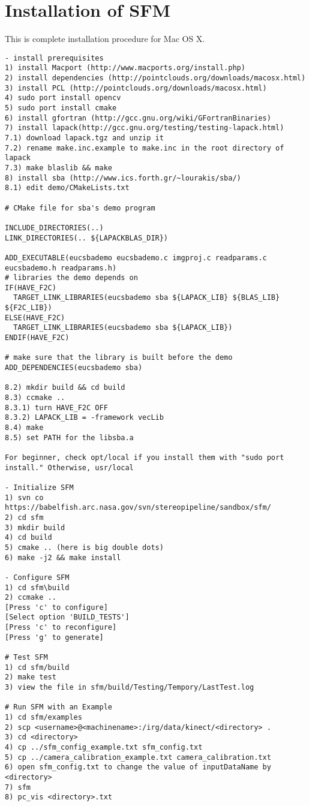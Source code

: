 \documentclass[12pt]{article}
\begin{document}
\section{Installation of SFM}

This is complete installation procedure for Mac OS X.

\begin{lstlisting}
- install prerequisites
1) install Macport (http://www.macports.org/install.php) 
2) install dependencies (http://pointclouds.org/downloads/macosx.html)
3) install PCL (http://pointclouds.org/downloads/macosx.html)
4) sudo port install opencv
5) sudo port install cmake
6) install gfortran (http://gcc.gnu.org/wiki/GFortranBinaries)
7) install lapack(http://gcc.gnu.org/testing/testing-lapack.html)
7.1) download lapack.tgz and unzip it
7.2) rename make.inc.example to make.inc in the root directory of lapack 
7.3) make blaslib && make
8) install sba (http://www.ics.forth.gr/~lourakis/sba/) 
8.1) edit demo/CMakeLists.txt

# CMake file for sba's demo program

INCLUDE_DIRECTORIES(..)
LINK_DIRECTORIES(.. ${LAPACKBLAS_DIR})

ADD_EXECUTABLE(eucsbademo eucsbademo.c imgproj.c readparams.c eucsbademo.h readparams.h)
# libraries the demo depends on
IF(HAVE_F2C)
  TARGET_LINK_LIBRARIES(eucsbademo sba ${LAPACK_LIB} ${BLAS_LIB} ${F2C_LIB})
ELSE(HAVE_F2C)
  TARGET_LINK_LIBRARIES(eucsbademo sba ${LAPACK_LIB})
ENDIF(HAVE_F2C)

# make sure that the library is built before the demo
ADD_DEPENDENCIES(eucsbademo sba)

8.2) mkdir build && cd build
8.3) ccmake ..
8.3.1) turn HAVE_F2C OFF
8.3.2) LAPACK_LIB = -framework vecLib
8.4) make
8.5) set PATH for the libsba.a

For beginner, check opt/local if you install them with "sudo port install." Otherwise, usr/local

- Initialize SFM
1) svn co https://babelfish.arc.nasa.gov/svn/stereopipeline/sandbox/sfm/
2) cd sfm
3) mkdir build
4) cd build
5) cmake .. (here is big double dots)
6) make -j2 && make install

- Configure SFM
1) cd sfm\build
2) ccmake ..
[Press 'c' to configure]
[Select option 'BUILD_TESTS']
[Press 'c' to reconfigure]
[Press 'g' to generate]

# Test SFM
1) cd sfm/build
2) make test
3) view the file in sfm/build/Testing/Tempory/LastTest.log

# Run SFM with an Example
1) cd sfm/examples
2) scp <username>@<machinename>:/irg/data/kinect/<directory> .
3) cd <directory>
4) cp ../sfm_config_example.txt sfm_config.txt
5) cp ../camera_calibration_example.txt camera_calibration.txt
6) open sfm_config.txt to change the value of inputDataName by <directory>
7) sfm
8) pc_vis <directory>.txt


\end{lstlisting}
\end{document}
